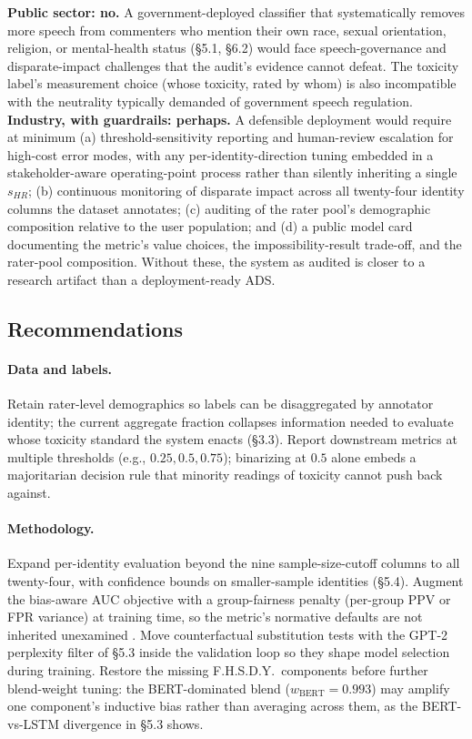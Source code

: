 \documentclass[11pt]{article}
\begin{document}
\textbf{Public sector: no.} A government-deployed classifier that systematically removes more speech from commenters who mention their own race, sexual orientation, religion, or mental-health status (\S5.1, \S6.2) would face speech-governance and disparate-impact challenges that the audit's evidence cannot defeat. The toxicity label's measurement choice (whose toxicity, rated by whom) is also incompatible with the neutrality typically demanded of government speech regulation. \textbf{Industry, with guardrails: perhaps.} A defensible deployment would require at minimum (a) threshold-sensitivity reporting and human-review escalation for high-cost error modes, with any per-identity-direction tuning embedded in a stakeholder-aware operating-point process rather than silently inheriting a single $s_{HR}$; (b) continuous monitoring of disparate impact across all twenty-four identity columns the dataset annotates; (c) auditing of the rater pool's demographic composition relative to the user population; and (d) a public model card \citep{mitchell2019model} documenting the metric's value choices, the impossibility-result trade-off, and the rater-pool composition. Without these, the system as audited is closer to a research artifact than a deployment-ready ADS.

\subsection{Recommendations}

\paragraph{Data and labels.} Retain rater-level demographics so labels can be disaggregated by annotator identity; the current aggregate fraction collapses information needed to evaluate whose toxicity standard the system enacts (\S3.3). Report downstream metrics at multiple thresholds (e.g., $0.25, 0.5, 0.75$); binarizing at $0.5$ alone embeds a majoritarian decision rule that minority readings of toxicity cannot push back against.

\paragraph{Methodology.} Expand per-identity evaluation beyond the nine sample-size-cutoff columns to all twenty-four, with confidence bounds on smaller-sample identities (\S5.4). Augment the bias-aware AUC objective with a group-fairness penalty (per-group PPV or FPR variance) at training time, so the metric's normative defaults are not inherited unexamined \citep{raji2020closing}. Move counterfactual substitution tests with the GPT-2 perplexity filter of \S5.3 inside the validation loop so they shape model selection during training. Restore the missing F.H.S.D.Y.\ components before further blend-weight tuning: the BERT-dominated blend ($w_{\text{BERT}} = 0.993$) may amplify one component's inductive bias rather than averaging across them, as the BERT-vs-LSTM divergence in \S5.3 shows.
\end{document}
